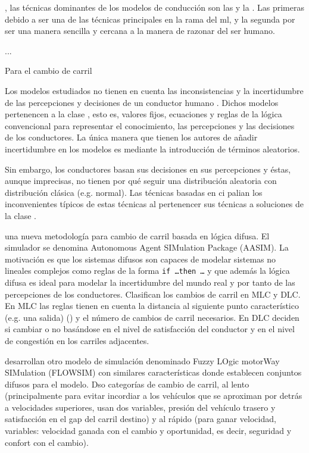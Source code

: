 , las técnicas dominantes de los modelos de conducción son las  y la . Las primeras debido a ser una de las técnicas principales en la rama del \gls{ml}, y la segunda por ser una manera sencilla y cercana a la manera de razonar del ser humano.

...

Para el cambio de carril

Los modelos estudiados no tienen en cuenta las inconsistencias y la incertidumbre de las percepciones y decisiones de un conductor humano \cite{McDonald1997}. Dichos modelos pertenencen a la clase , esto es, valores fijos, ecuaciones y reglas de la lógica convencional para representar el conocimiento, las percepciones y las decisiones de los conductores. La única manera que tienen los autores de añadir incertidumbre en los modelos es mediante la introducción de términos aleatorios.

Sin embargo, los conductores basan sus decisiones en sus percepciones y éstas, aunque imprecisas, no tienen por qué seguir una distribución aleatoria con distribución clásica (e.g. normal). Las técnicas basadas en \gls{ci} palian los inconvenientes típicos de estas técnicas al pertenencer sus técnicas a soluciones de la clase .

\cite{Das2009} una nueva metodología para cambio de carril basada en lógica difusa. El simulador se denomina Autonomous Agent SIMulation Package (AASIM). La motivación es que los sistemas difusos son capaces de modelar sistemas no lineales complejos como  reglas de la forma \texttt{if \ldots then \ldots} y que además la lógica difusa es ideal para modelar la incertidumbre del mundo real y por tanto de las percepciones de los conductores. Clasifican los cambios de carril en MLC y DLC. En MLC las reglas tienen en cuenta la distancia al siguiente punto característico (e.g. una salida) () y el número de cambios de carril necesarios. En DLC deciden si cambiar o no basándose en el nivel de satisfacción del conductor y en el nivel de congestión en los carriles adjacentes.

\cite{McDonald1997, Wu2003} desarrollan otro modelo de simulación denominado Fuzzy LOgic motorWay SIMulation (FLOWSIM) con similares características donde establecen conjuntos difusos para el modelo. Dso categorías de cambio de carril, al lento (principalmente para evitar incordiar a los vehículos que se aproximan por detrás a velocidades superiores, usan dos variables, presión del vehículo trasero y satisfacción en el gap del carril destino) y al rápido (para ganar velocidad, variables: velocidad ganada con el cambio y oportunidad, es decir, seguridad y confort con el cambio).

